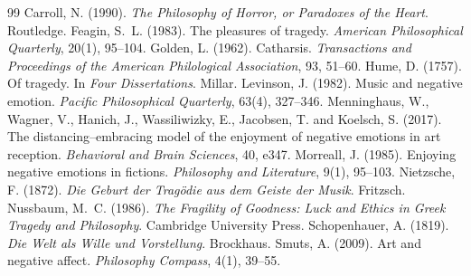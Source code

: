 \documentclass{situationist-preprint}
\begin{document}
\begin{thebibliography}{99}\small
{} Carroll, N. (1990). \emph{The Philosophy of Horror, or Paradoxes of the Heart}. Routledge.
 Feagin, S.~L. (1983). The pleasures of tragedy. \emph{American Philosophical Quarterly}, 20(1), 95--104.
 Golden, L. (1962). Catharsis. \emph{Transactions and Proceedings of the American Philological Association}, 93, 51--60.
 Hume, D. (1757). Of tragedy. In \emph{Four Dissertations}. Millar.
 Levinson, J. (1982). Music and negative emotion. \emph{Pacific Philosophical Quarterly}, 63(4), 327--346.
 Menninghaus, W., Wagner, V., Hanich, J., Wassiliwizky, E., Jacobsen, T. and Koelsch, S. (2017). The distancing--embracing model of the enjoyment of negative emotions in art reception. \emph{Behavioral and Brain Sciences}, 40, e347.
 Morreall, J. (1985). Enjoying negative emotions in fictions. \emph{Philosophy and Literature}, 9(1), 95--103.
 Nietzsche, F. (1872). \emph{Die Geburt der Tragödie aus dem Geiste der Musik}. Fritzsch.
 Nussbaum, M.~C. (1986). \emph{The Fragility of Goodness: Luck and Ethics in Greek Tragedy and Philosophy}. Cambridge University Press.
 Schopenhauer, A. (1819). \emph{Die Welt als Wille und Vorstellung}. Brockhaus.
 Smuts, A. (2009). Art and negative affect. \emph{Philosophy Compass}, 4(1), 39--55.
\end{thebibliography}
\end{document}
